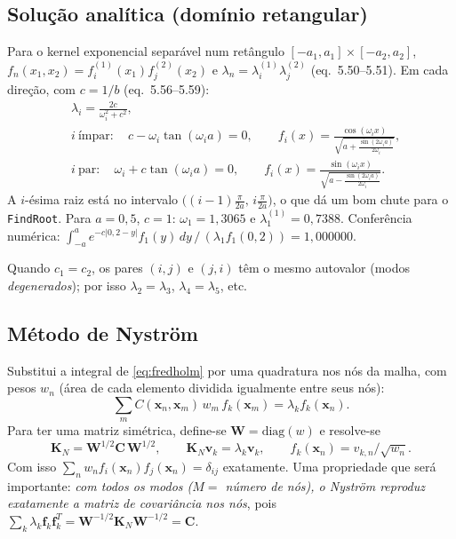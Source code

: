 \documentclass[11pt,a4paper]{article}
\newcommand{\bx}{\bm{x}}
\begin{document}
\subsection{Solução analítica (domínio retangular)}
Para o kernel exponencial separável num retângulo $[-a_1,a_1]\times[-a_2,a_2]$, $f_n(x_1,x_2)=f^{(1)}_i(x_1)f^{(2)}_j(x_2)$ e $\lambda_n=\lambda^{(1)}_i\lambda^{(2)}_j$ (eq.~5.50--5.51). Em cada direção, com $c=1/b$ (eq.~5.56--5.59):
\begin{align}
  &\lambda_i=\frac{2c}{\omega_i^2+c^2},\\
  &i\ \text{ímpar}:\quad c-\omega_i\tan(\omega_i a)=0,\qquad f_i(x)=\frac{\cos(\omega_i x)}{\sqrt{a+\frac{\sin(2\omega_i a)}{2\omega_i}}},\\
  &i\ \text{par}:\quad \omega_i+c\tan(\omega_i a)=0,\qquad f_i(x)=\frac{\sin(\omega_i x)}{\sqrt{a-\frac{\sin(2\omega_i a)}{2\omega_i}}}.
\end{align}
A $i$-ésima raiz está no intervalo $\big((i-1)\tfrac{\pi}{2a},\,i\tfrac{\pi}{2a}\big)$, o que dá um bom chute para o \texttt{FindRoot}. Para $a=0{,}5$, $c=1$: $\omega_1=1{,}3065$ e $\lambda^{(1)}_1=0{,}7388$. Conferência numérica: $\int_{-a}^{a}e^{-c|0{,}2-y|}f_1(y)\,dy\,/\,(\lambda_1 f_1(0{,}2))=1{,}000000$.

Quando $c_1=c_2$, os pares $(i,j)$ e $(j,i)$ têm o mesmo autovalor (modos \emph{degenerados}); por isso $\lambda_2=\lambda_3$, $\lambda_4=\lambda_5$, etc.

\subsection{Método de Nyström}
Substitui a integral de \eqref{eq:fredholm} por uma quadratura nos nós da malha, com pesos $w_n$ (área de cada elemento dividida igualmente entre seus nós):
\begin{equation}
  \sum_{m}C(\bx_n,\bx_m)\,w_m\,f_k(\bx_m)=\lambda_k f_k(\bx_n).
\end{equation}
Para ter uma matriz simétrica, define-se $\bm{W}=\mathrm{diag}(w)$ e resolve-se
\begin{equation}
  \bm{K}_N=\bm{W}^{1/2}\bm{C}\,\bm{W}^{1/2},\qquad \bm{K}_N\bm{v}_k=\lambda_k\bm{v}_k,\qquad f_k(\bx_n)=v_{k,n}/\sqrt{w_n}.
\end{equation}
Com isso $\sum_n w_n f_i(\bx_n)f_j(\bx_n)=\delta_{ij}$ exatamente.
Uma propriedade que será importante: \emph{com todos os modos ($M=$ número de nós), o Nyström reproduz exatamente a matriz de covariância nos nós}, pois $\sum_k\lambda_k\bm{f}_k\bm{f}_k^T=\bm{W}^{-1/2}\bm{K}_N\bm{W}^{-1/2}=\bm{C}$.
\end{document}
